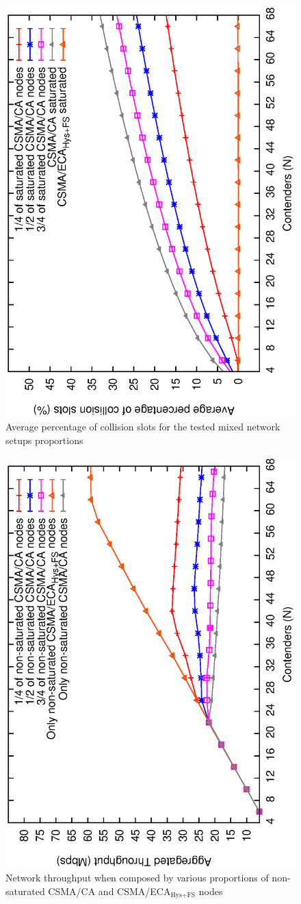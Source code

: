 	\begin{figure}[tb]
		\centering
		\includegraphics[width=0.7\linewidth,angle=-90]{figures/saturated/mixed/collisions-mixed/collisions-mixed-saturated.eps}
		\caption{Average percentage of collision slots for the tested mixed network setups proportions}
		\label{fig:mixedCollisions-sat}
	\end{figure}
	
	\begin{figure}[tb!!!]
		\centering
		\includegraphics[width=0.7\linewidth,angle=-90]{figures/unsaturated/mixed/throughput-mixed/throughput-unsaturated-mixed.eps}
		\caption{Network throughput when composed by various proportions of non-saturated CSMA/CA and CSMA/ECA$_{\text{Hys+FS}}$ nodes}
		\label{fig:mixedThroughput-unsat}
	\end{figure}
	

